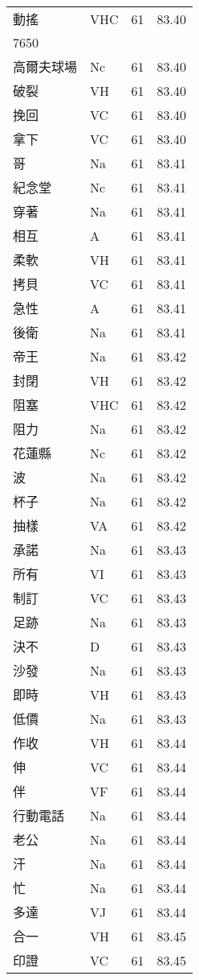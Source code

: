 \documentclass[twocolumn]{book}
\begin{document}
\begin{supertabular}{llrr}
動搖 & VHC & 61 &  83.40\\
7650\\
高爾夫球場 & Nc & 61 &  83.40\\
破裂 & VH & 61 &  83.40\\
挽回 & VC & 61 &  83.40\\
拿下 & VC & 61 &  83.40\\
哥 & Na & 61 &  83.41\\
紀念堂 & Nc & 61 &  83.41\\
穿著 & Na & 61 &  83.41\\
相互 & A & 61 &  83.41\\
柔軟 & VH & 61 &  83.41\\
拷貝 & VC & 61 &  83.41\\
急性 & A & 61 &  83.41\\
後衛 & Na & 61 &  83.41\\
帝王 & Na & 61 &  83.42\\
封閉 & VH & 61 &  83.42\\
阻塞 & VHC & 61 &  83.42\\
阻力 & Na & 61 &  83.42\\
花蓮縣 & Nc & 61 &  83.42\\
波 & Na & 61 &  83.42\\
杯子 & Na & 61 &  83.42\\
抽樣 & VA & 61 &  83.42\\
承諾 & Na & 61 &  83.43\\
所有 & VI & 61 &  83.43\\
制訂 & VC & 61 &  83.43\\
足跡 & Na & 61 &  83.43\\
決不 & D & 61 &  83.43\\
沙發 & Na & 61 &  83.43\\
即時 & VH & 61 &  83.43\\
低價 & Na & 61 &  83.43\\
作收 & VH & 61 &  83.44\\
伸 & VC & 61 &  83.44\\
伴 & VF & 61 &  83.44\\
行動電話 & Na & 61 &  83.44\\
老公 & Na & 61 &  83.44\\
汗 & Na & 61 &  83.44\\
忙 & Na & 61 &  83.44\\
多達 & VJ & 61 &  83.44\\
合一 & VH & 61 &  83.45\\
印證 & VC & 61 &  83.45\\

\end{supertabular}
\end{document}
